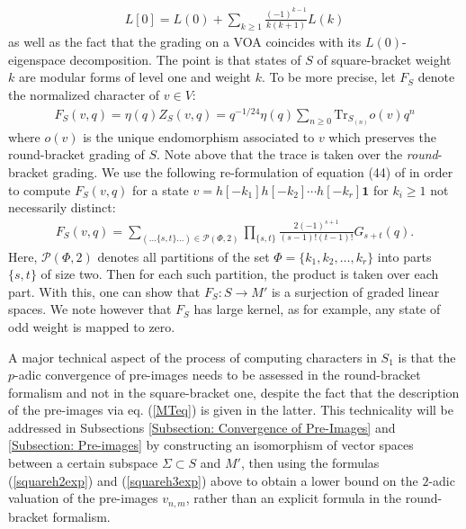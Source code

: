\documentclass[10pt,a4paper]{amsart}
\numberwithin{equation}{section}
\theoremstyle{definition}
\newcommand{\Heis}{S}
\newcommand{\pHeis}{S_{1}}
\begin{document}
\begin{align*}
    L[0] = L(0) + \sum_{k \geq 1} \frac{(-1)^{k-1}}{k(k+1)}L(k)
\end{align*}
as well as the fact that the grading on a VOA coincides with its $L(0)$-eigenspace decomposition. The point is that states of $\Heis$ of square-bracket weight $k$ are modular forms of level one and weight $k$. To be more precise, let $F_{\Heis}$ denote the normalized character of $v \in V$:
\begin{align*}
    F_{\Heis}(v,q) = \eta (q) Z_{\Heis}(v,q) = q^{-1/24} \eta (q) \sum_{n \geq 0} \text{Tr}_{\Heis_{(n)}}o(v)q^{n}
\end{align*}
where $o(v)$ is the unique endomorphism associated to $v$ which preserves the round-bracket grading of $\Heis$. Note above that the trace is taken over the \textit{round}-bracket grading. We use the following re-formulation of equation (44) of \cite{MT} in order to compute $F_{\Heis}(v,q)$ for a state $v = h[-k_{1}]h[-k_{2}] \cdots h[-k_{r}]\textbf{1}$ for $k_{i} \geq 1$ not necessarily distinct:
\begin{align}
    F_{\Heis}(v,q) = \sum_{(\ldots \lbrace s,t \rbrace \ldots) \in \mathcal{P}(\Phi,2)} \prod_{\lbrace s,t \rbrace} \frac{2(-1)^{s+1}}{(s-1)!(t-1)!}G_{s+t}(q). \label{MTeq}
\end{align}
Here, $\mathcal{P}(\Phi,2)$ denotes all partitions of the set $\Phi = \lbrace k_{1}, k_{2}, \ldots , k_{r} \rbrace$ into parts $\lbrace s,t \rbrace$ of size two. Then for each such partition, the product is taken over each part. With this, one can show that $F_{\Heis}: \Heis \to M'$ is a surjection of graded linear spaces. We note however that $F_{\Heis}$ has large kernel, as for example, any state of odd weight is mapped to zero. 

A major technical aspect of the process of computing characters in $\pHeis$ is that the $p$-adic convergence of pre-images needs to be assessed in the round-bracket formalism and not in the square-bracket one, despite the fact that the description of the pre-images via eq. (\ref{MTeq}) is given in the latter. This technicality will be addressed in Subsections \ref{Subsection: Convergence of Pre-Images} and \ref{Subsection: Pre-images} by constructing an isomorphism of vector spaces between a certain subspace $\Sigma \subset \Heis$ and $M'$, then using the formulas (\ref{squareh2exp}) and (\ref{squareh3exp}) above to obtain a lower bound on the $2$-adic valuation of the pre-images $v_{n,m}$, rather than an explicit formula in the round-bracket formalism.
\end{document}
